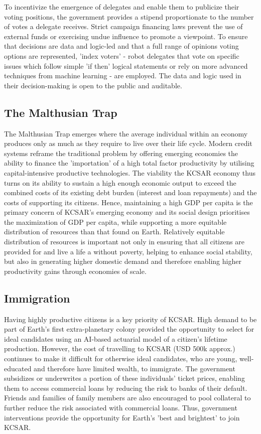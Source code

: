 \documentclass[fleqn,10pt]{Stylesheet} %
\begin{document}
To incentivize the emergence of delegates and enable them to publicize their voting positions, the government provides a stipend proportionate to the number of votes a delegate receives. Strict campaign financing laws prevent the use of external funds or exercising undue influence to promote a viewpoint. To ensure that decisions are data and logic-led and that a full range of opinions voting options are represented, 'index voters' - robot delegates that vote on specific issues which follow simple 'if then' logical statements or rely on more advanced techniques from machine learning - are employed. The data and logic used in their decision-making is open to the public and auditable.

\subsection{The Malthusian Trap}
The Malthusian Trap emerges where the average individual within an economy produces only as much as they require to live over their life cycle. Modern credit systems reframe the traditional problem by offering emerging economies the ability to finance the 'importation' of a high total factor productivity by utilising capital-intensive productive technologies. The viability the KCSAR economy thus turns on its ability to sustain a high enough economic output to exceed the combined costs of its existing debt burden (interest and loan repayments) and the costs of supporting its citizens. Hence, maintaining a high GDP per capita is the primary concern of KCSAR's emerging economy and its social design prioritises the maximization of GDP per capita, while supporting a more equitable distribution of resources than that found on Earth. Relatively equitable distribution of resources is important not only in ensuring that all citizens are provided for and live a life a without poverty, helping to enhance social stability, but also in generating higher domestic demand and therefore enabling higher productivity gains through economies of scale. \cite{Kogel} 

\subsection{Immigration}
Having highly productive citizens is a key priority of KCSAR. High demand to be part of Earth's first extra-planetary colony provided the opportunity to select for ideal candidates using an AI-based actuarial model of a citizen's lifetime production. However, the cost of travelling to KCSAR (USD 500k approx.) continues to make it difficult for otherwise ideal candidates, who are young, well-educated and therefore have limited wealth, to immigrate. The government subsidizes or underwrites a portion of these individuals' ticket prices, enabling them to access commercial loans by reducing the risk to banks of their default. Friends and families of family members are also encouraged to pool collateral to further reduce the risk associated with commercial loans. Thus, government interventions provide the opportunity for Earth's 'best and brightest' to join KCSAR.
\end{document}
